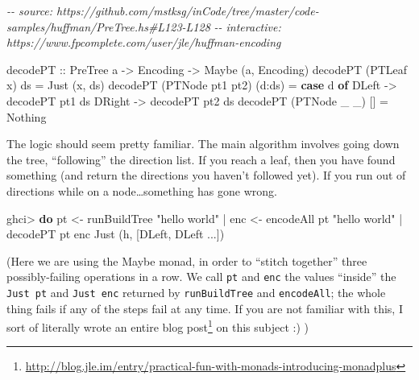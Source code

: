 \documentclass[]{article}
\newenvironment{Shaded}{}{}
\newcommand{\CharTok}[1]{\textcolor[rgb]{0.25,0.44,0.63}{#1}}
\newcommand{\CommentTok}[1]{\textcolor[rgb]{0.38,0.63,0.69}{\textit{#1}}}
\newcommand{\DataTypeTok}[1]{\textcolor[rgb]{0.56,0.13,0.00}{#1}}
\newcommand{\KeywordTok}[1]{\textcolor[rgb]{0.00,0.44,0.13}{\textbf{#1}}}
\newcommand{\NormalTok}[1]{#1}
\newcommand{\OperatorTok}[1]{\textcolor[rgb]{0.40,0.40,0.40}{#1}}
\newcommand{\OtherTok}[1]{\textcolor[rgb]{0.00,0.44,0.13}{#1}}
\newcommand{\StringTok}[1]{\textcolor[rgb]{0.25,0.44,0.63}{#1}}
\renewcommand{\href}[2]{#2\footnote{\url{#1}}}
\begin{document}
\begin{Shaded}
\begin{Highlighting}[]
\CommentTok{{-}{-} source: https://github.com/mstksg/inCode/tree/master/code{-}samples/huffman/PreTree.hs\#L123{-}L128}
\CommentTok{{-}{-} interactive: https://www.fpcomplete.com/user/jle/huffman{-}encoding}

\OtherTok{decodePT ::} \DataTypeTok{PreTree}\NormalTok{ a }\OtherTok{{-}>} \DataTypeTok{Encoding} \OtherTok{{-}>} \DataTypeTok{Maybe}\NormalTok{ (a, }\DataTypeTok{Encoding}\NormalTok{)}
\NormalTok{decodePT (}\DataTypeTok{PTLeaf}\NormalTok{ x)       ds     }\OtherTok{=} \DataTypeTok{Just}\NormalTok{ (x, ds)}
\NormalTok{decodePT (}\DataTypeTok{PTNode}\NormalTok{ pt1 pt2) (d}\OperatorTok{:}\NormalTok{ds) }\OtherTok{=} \KeywordTok{case}\NormalTok{ d }\KeywordTok{of}
                                     \DataTypeTok{DLeft}  \OtherTok{{-}>}\NormalTok{ decodePT pt1 ds}
                                     \DataTypeTok{DRight} \OtherTok{{-}>}\NormalTok{ decodePT pt2 ds}
\NormalTok{decodePT (}\DataTypeTok{PTNode}\NormalTok{ \_ \_)     []     }\OtherTok{=} \DataTypeTok{Nothing}
\end{Highlighting}
\end{Shaded}

The logic should seem pretty familiar. The main algorithm involves going down
the tree, ``following'' the direction list. If you reach a leaf, then you have
found something (and return the directions you haven't followed yet). If you run
out of directions while on a node\ldots something has gone wrong.

\begin{Shaded}
\begin{Highlighting}[]
\NormalTok{ghci}\OperatorTok{>} \KeywordTok{do}\NormalTok{  pt  }\OtherTok{<{-}}\NormalTok{ runBuildTree }\StringTok{"hello world"}
    \OperatorTok{|}\NormalTok{     enc }\OtherTok{<{-}}\NormalTok{ encodeAll pt }\StringTok{"hello world"}
    \OperatorTok{|}\NormalTok{     decodePT pt enc}
\DataTypeTok{Just}\NormalTok{ (}\CharTok{\textquotesingle{}h\textquotesingle{}}\NormalTok{, [}\DataTypeTok{DLeft}\NormalTok{, }\DataTypeTok{DLeft} \OperatorTok{...}\NormalTok{])}
\end{Highlighting}
\end{Shaded}

(Here we are using the Maybe monad, in order to ``stitch together'' three
possibly-failing operations in a row. We call \texttt{pt} and \texttt{enc} the
values ``inside'' the \texttt{Just\ pt} and \texttt{Just\ enc} returned by
\texttt{runBuildTree} and \texttt{encodeAll}; the whole thing fails if any of
the steps fail at any time. If you are not familiar with this,
\href{http://blog.jle.im/entry/practical-fun-with-monads-introducing-monadplus}{I
sort of literally wrote an entire blog post} on this subject :) )
\end{document}
